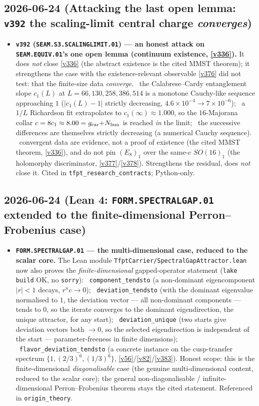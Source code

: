 \subsection*{2026-06-24 (Attacking the last open lemma: \texttt{v392} the scaling-limit central charge \emph{converges})}
\begin{itemize}
\item \textbf{\texttt{v392} (\texttt{SEAM.S3.SCALINGLIMIT.01}) --- an honest attack on \texttt{SEAM.EQUIV.01}'s one
open lemma (continuum existence, \vref{v336}).} It does \emph{not} close \vref{v336} (the abstract existence is the
cited MMST theorem); it strengthens the case with the existence-relevant observable \vref{v376} did not test: that
the finite-size data \emph{converge}. \mE\ the Calabrese--Cardy entanglement slope $c_1(L)$ at $L=66,130,258,386,514$
is a monotone Cauchy-like sequence approaching $1$ ($|c_1(L)-1|$ strictly decreasing, $4.6\times10^{-4}\to7\times10^{-6}$);
\mE\ a $1/L$ Richardson fit extrapolates to $c_1(\infty)\approx1.000$, so the $16$-Majorana collar $c=8c_1\approx8.00
=g_{\mathrm{car}}{+}N_{\mathrm{fam}}$ is reached \emph{in} the limit; \mE\ the successive differences are themselves strictly decreasing
(a numerical Cauchy sequence). \mO\ convergent data are evidence, not a proof of existence (the cited MMST theorem,
\vref{v336}), and do not pin $(E_8)_1$ over the same-$c$ $SO(16)_1$ (the holomorphy discriminator, \vref{v377}/\vref{v378}).
Strengthens the residual, does \emph{not} close it. Cited in \texttt{tfpt\_research\_contracts}; Python-only.
\end{itemize}

\subsection*{2026-06-24 (Lean 4: \texttt{FORM.SPECTRALGAP.01} extended to the finite-dimensional Perron--Frobenius case)}
\begin{itemize}
\item \textbf{\texttt{FORM.SPECTRALGAP.01} --- the multi-dimensional case, reduced to the scalar core.} The Lean
module \texttt{TfptCarrier/SpectralGapAttractor.lean} now also proves the \emph{finite-dimensional} gapped-operator
statement (\texttt{lake build} OK, no \texttt{sorry}): \mE\ \texttt{component\_tendsto} (a non-dominant eigencomponent
$|r|<1$ decays, $r^n c\to0$); \mE\ \texttt{deviation\_tendsto} (with the dominant eigenvalue normalised to $1$, the
deviation vector --- all non-dominant components --- tends to $0$, so the iterate converges to the dominant
eigendirection, the unique attractor, for any start); \mE\ \texttt{deviation\_unique} (two starts give deviation
vectors both $\to0$, so the selected eigendirection is independent of the start --- parameter-freeness in finite
dimensions); \mE\ \texttt{flavor\_deviation\_tendsto} (a concrete instance on the cusp-transfer spectrum
$\{1,(2/3)^6,(1/3)^6\}$, \vref{v56}/\vref{v82}/\vref{v383}). Honest scope: this is the finite-dimensional
\emph{diagonalisable} case (the genuine multi-dimensional content, reduced to the scalar core); the general
non-diagonalisable / infinite-dimensional Perron--Frobenius theorem stays the cited statement. Referenced in
\texttt{origin\_theory}.
\end{itemize}

